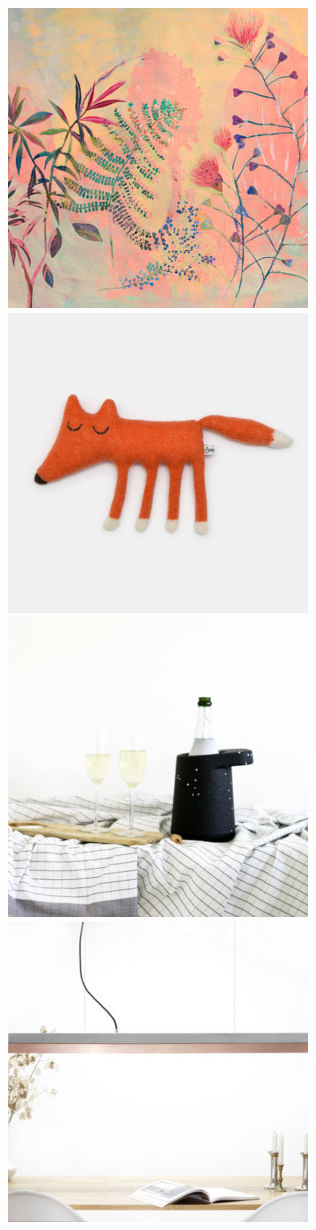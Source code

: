 \documentclass[conference,a4paper]{IEEEtran}
\begin{document}
\begin{figure}
     \includegraphics[scale=0.15]{./figures/sample9.jpg}
     \includegraphics[scale=0.15]{./figures/sample10.jpg}
    \includegraphics[scale=0.15]{./figures/sample11.jpg}
     \includegraphics[scale=0.15]{./figures/sample12.jpg}

\end{figure}
\end{document}
